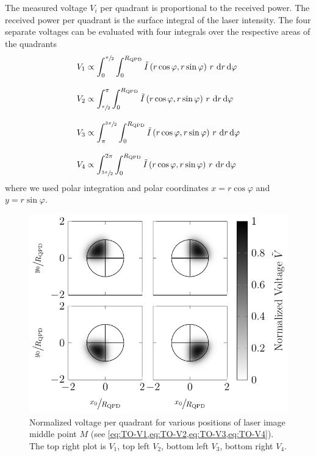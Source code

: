 The measured voltage $V_{i}$ per quadrant is proportional to the received 
power. The received power per quadrant is the surface integral of the laser 
intensity. The four separate voltages can be evaluated with four integrals over 
the respective areas of the quadrants
\begin{subequations}
\begin{align}
  V_{\mathrm{1}} & \propto \int_{0}^{\sfrac{\pi}{2}}\int_{0}^{R_{\mathrm{QPD}}}
  \tilde{I}\left( r\cos\varphi, r\sin\varphi 
  \right)\,r\,\dd{r}\dd{\varphi}
  \label{eq:TO-V1}
  \\[3mm]
  V_{\mathrm{2}} & \propto \int_{\sfrac{\pi}{2}}^{\pi}\int_{0}^{R_{\mathrm{QPD}}}
  \tilde{I}\left(r\cos\varphi, 
  r\sin\varphi\right)\,r\,\dd{r}\dd{\varphi}
  \label{eq:TO-V2}
  \\[3mm]
  V_{\mathrm{3}} & \propto \int_{\pi}^{\sfrac{3\pi}{2}}\int_{0}^{R_{\mathrm{QPD}}}
  \tilde{I}\left(r\cos\varphi, 
  r\sin\varphi\right)\,r\,\dd{r}\dd{\varphi}
  \label{eq:TO-V3}
  \\[3mm]
  V_{\mathrm{4}} & \propto \int_{\sfrac{3\pi}{2}}^{2\pi}\int_{0}^{R_{\mathrm{QPD}}}
  \tilde{I}\left(r\cos\varphi, 
  r\sin\varphi\right)\,r\,\dd{r}\dd{\varphi}
  \label{eq:TO-V4}
\end{align}
\end{subequations}
where we used polar integration and polar coordinates $x=r\cos\varphi$ and 
$y=r\sin\varphi$.

\begin{figure}[tbp]
  \centering
  \includegraphics[]{External/V_quadrant.pdf}
  \caption{Normalized voltage per quadrant for various positions of laser image 
  middle point $M$ (see \cref{eq:TO-V1,eq:TO-V2,eq:TO-V3,eq:TO-V4}). The top 
right plot is $V_{1}$, top left $V_{2}$, bottom left $V_{3}$, bottom right 
$V_{4}$.}
  \label{fig:TO-quadrant_Intensity}
\end{figure}

